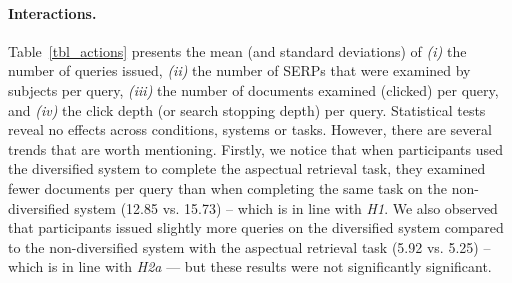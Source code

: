\paragraph{Interactions.} Table~\ref{tbl_actions} presents the mean (and standard deviations) of \textit{(i)} the number of queries issued, \textit{(ii)} the number of SERPs that were examined by subjects per query, \textit{(iii)} the number of documents examined (clicked) per query, and \textit{(iv)} the click depth (or search stopping depth) per query. %
Statistical tests reveal no effects across conditions, systems or tasks. However, there are several trends that are worth mentioning. Firstly, we notice that when participants used the diversified system to complete the aspectual retrieval task, they examined fewer documents per query than when completing the same task on the non-diversified system (12.85 vs. 15.73) -- which is in line with \emph{H1}. We also observed that participants issued slightly more queries on the diversified system compared to the non-diversified system with the aspectual retrieval task (5.92 vs. 5.25) -- which is in line with \emph{H2a} --- but these results were not significantly significant.



